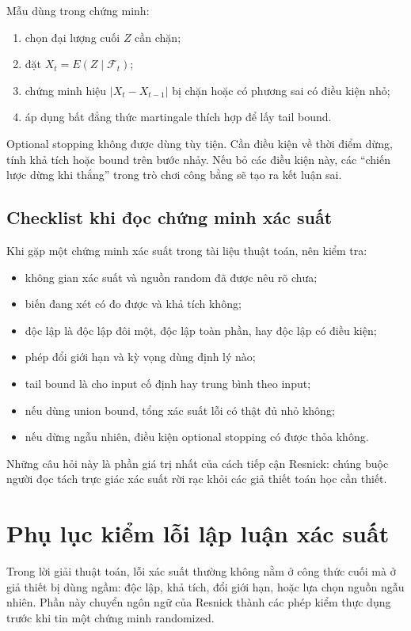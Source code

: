 \documentclass[11pt]{article}
\begin{document}
Mẫu dùng trong chứng minh:
\begin{enumerate}
  \item chọn đại lượng cuối \(Z\) cần chặn;
  \item đặt \(X_t=E(Z\mid\mathcal{F}_t)\);
  \item chứng minh hiệu \(|X_t-X_{t-1}|\) bị chặn hoặc có phương sai có điều
        kiện nhỏ;
  \item áp dụng bất đẳng thức martingale thích hợp để lấy tail bound.
\end{enumerate}

Optional stopping không được dùng tùy tiện. Cần điều kiện về thời điểm dừng,
tính khả tích hoặc bound trên bước nhảy. Nếu bỏ các điều kiện này, các ``chiến
lược dừng khi thắng'' trong trò chơi công bằng sẽ tạo ra kết luận sai.

\subsection{Checklist khi đọc chứng minh xác suất}

Khi gặp một chứng minh xác suất trong tài liệu thuật toán, nên kiểm tra:
\begin{itemize}
  \item không gian xác suất và nguồn random đã được nêu rõ chưa;
  \item biến đang xét có đo được và khả tích không;
  \item độc lập là độc lập đôi một, độc lập toàn phần, hay độc lập có điều kiện;
  \item phép đổi giới hạn và kỳ vọng dùng định lý nào;
  \item tail bound là cho input cố định hay trung bình theo input;
  \item nếu dùng union bound, tổng xác suất lỗi có thật đủ nhỏ không;
  \item nếu dừng ngẫu nhiên, điều kiện optional stopping có được thỏa không.
\end{itemize}

Những câu hỏi này là phần giá trị nhất của cách tiếp cận Resnick: chúng buộc
người đọc tách trực giác xác suất rời rạc khỏi các giả thiết toán học cần thiết.

\section{Phụ lục kiểm lỗi lập luận xác suất}

Trong lời giải thuật toán, lỗi xác suất thường không nằm ở công thức cuối mà ở
giả thiết bị dùng ngầm: độc lập, khả tích, đổi giới hạn, hoặc lựa chọn nguồn
ngẫu nhiên. Phần này chuyển ngôn ngữ của Resnick thành các phép kiểm thực dụng
trước khi tin một chứng minh randomized.
\end{document}
